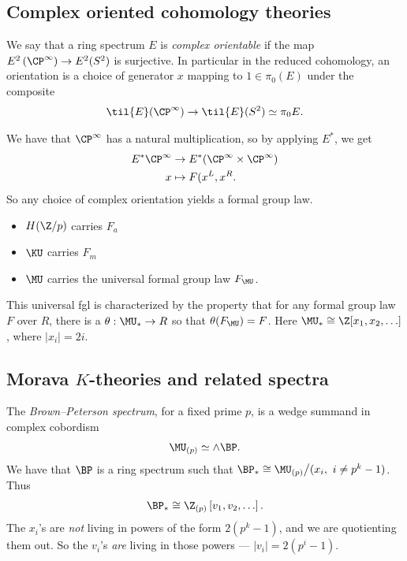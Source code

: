 \subsection{Complex oriented cohomology theories}

We say that a ring spectrum $E$ is \textit{complex orientable} if the map $E^2 \left( \CP^\infty \right) \to E^2(S^2)$ is surjective. In particular in the reduced cohomology, an orientation is a choice of generator $x$ mapping to $1 \in \pi_0(E)$ under the composite
\begin{align*}
    \til{E}(\CP^\infty) \to \til{E}(S^2) \simeq \pi_0 E.
\end{align*}

We have that $\CP^\infty$ has a natural multiplication, so by applying $E^\ast$, we get
\begin{align*}
    E^\ast \CP^\infty &\to E^\ast(\CP^\infty \times\CP^\infty) \\
    x &\mapsto F(x^L, x^R.
\end{align*}
So any choice of complex orientation yields a formal group law.
\begin{itemize}
    \item $H(\Z/p)$ carries $F_a$
    \item $\KU$ carries $F_m$
    \item $\MU$ carries the universal formal group law $F_\MU$.
\end{itemize}

This universal fgl is characterized by the property that for any formal group law $F$ over $R$, there is a $\theta: \MU_\ast \to R$ so that $\theta(F_\MU) = F$. Here $\MU_\ast \cong \Z[x_1,x_2, \ldots]$, where $|x_i| = 2i$.

\subsection{Morava $K$-theories and related spectra}

The \textit{Brown--Peterson spectrum}, for a fixed prime $p$, is a wedge summand in complex cobordism
\begin{align*}
    \MU_{(p)} \simeq \wedge \BP.
\end{align*}
We have that $\BP$ is a ring spectrum such that $\BP_\ast \cong \MU_{(p)} \big/ (x_i,\ i\ne p^k-1)$. Thus
\begin{align*}
    \BP_\ast \cong \Z_{(p)} \left[ v_1, v_2, \ldots \right].
\end{align*}
The $x_i$'s are \textit{not} living in powers of the form $2(p^k-1)$, and we are quotienting them out. So the $v_i$'s \textit{are} living in those powers --- $|v_i| = 2(p^i-1)$.

